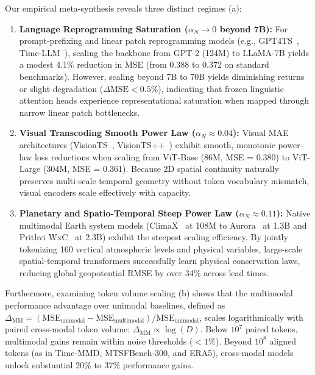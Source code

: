 Our empirical meta-synthesis reveals three distinct regimes (a):
\begin{enumerate}
    \item \textbf{Language Reprogramming Saturation ($\alpha_N \to 0$ beyond 7B):} For prompt-prefixing and linear patch reprogramming models (e.g., GPT4TS~\cite{Zhou2023OneFitsAll}, Time-LLM~\cite{Jin2023TimeLLM}), scaling the backbone from GPT-2 (124M) to LLaMA-7B yields a modest 4.1\% reduction in MSE (from 0.388 to 0.372 on standard benchmarks). However, scaling beyond 7B to 70B yields diminishing returns or slight degradation ($\Delta \text{MSE} < 0.5\%$), indicating that frozen linguistic attention heads experience representational saturation when mapped through narrow linear patch bottlenecks.
    \item \textbf{Visual Transcoding Smooth Power Law ($\alpha_N \approx 0.04$):} Visual MAE architectures (VisionTS~\cite{Chen2024VisionTS}, VisionTS++~\cite{Chen2025VisionTSPlus}) exhibit smooth, monotonic power-law loss reductions when scaling from ViT-Base (86M, MSE = 0.380) to ViT-Large (304M, MSE = 0.361). Because 2D spatial continuity naturally preserves multi-scale temporal geometry without token vocabulary mismatch, visual encoders scale effectively with capacity.
    \item \textbf{Planetary and Spatio-Temporal Steep Power Law ($\alpha_N \approx 0.11$):} Native multimodal Earth system models (ClimaX~\cite{Nguyen2023ClimaX} at 108M to Aurora~\cite{Bodnar2024Aurora} at 1.3B and Prithvi WxC~\cite{Schmude2024PrithviWxC} at 2.3B) exhibit the steepest scaling efficiency. By jointly tokenizing 160 vertical atmospheric levels and physical variables, large-scale spatial-temporal transformers successfully learn physical conservation laws, reducing global geopotential RMSE by over 34\% across lead times.
\end{enumerate}

Furthermore, examining token volume scaling (b) shows that the multimodal performance advantage over unimodal baselines, defined as $\Delta_{\mathrm{MM}} = (\text{MSE}_{\text{unimodal}} - \text{MSE}_{\text{multimodal}}) / \text{MSE}_{\text{unimodal}}$, scales logarithmically with paired cross-modal token volume: $\Delta_{\mathrm{MM}} \propto \log(D)$. Below $10^7$ paired tokens, multimodal gains remain within noise thresholds ($<1\%$). Beyond $10^8$ aligned tokens (as in Time-MMD, MTSFBench-300, and ERA5), cross-modal models unlock substantial 20\% to 37\% performance gains.

